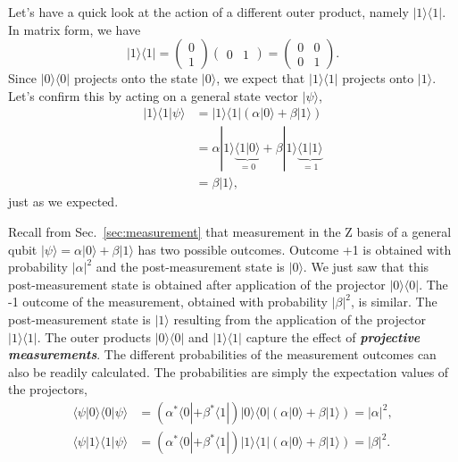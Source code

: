 Let's have a quick look at the action of a different outer product, namely $|1\rangle\langle1|$.
In matrix form, we have
\begin{equation}
    |1\rangle\langle1| = \begin{pmatrix} 0 \\ 1 \end{pmatrix} \begin{pmatrix} 0 & 1 \end{pmatrix} = \begin{pmatrix} 0 & 0  \\ 0 & 1 \end{pmatrix}.
\end{equation}
Since $|0\rangle\langle0|$ projects onto the state $|0\rangle$, we expect that $|1\rangle\langle1|$ projects onto $|1\rangle$.
Let's confirm this by acting on a general state vector $|\psi\rangle$,
\begin{align}
    |1\rangle\langle1|\psi\rangle & = |1\rangle\langle1| \left( \alpha|0\rangle + \beta|1\rangle \right) \label{eq:projector_11}\\
    & = \alpha |1\rangle\underbrace{\langle1|0\rangle}_{=0} + \beta |1\rangle\underbrace{\langle1|1\rangle}_{=1} \nonumber\\
    & = \beta|1\rangle, \nonumber
\end{align}
just as we expected.

Recall from Sec.~\ref{sec:measurement} that measurement in the Z basis of a general qubit $|\psi\rangle = \alpha |0\rangle + \beta |1\rangle$ has two possible outcomes.
Outcome +1 is obtained with probability $|\alpha|^2$ and the post-measurement state is $|0\rangle$.
We just saw that this post-measurement state is obtained after application of the projector $|0\rangle\langle0|$.
The -1 outcome of the measurement, obtained with probability $|\beta|^2$, is similar.
The post-measurement state is $|1\rangle$ resulting from the application of the projector $|1\rangle\langle1|$.
The outer products $|0\rangle\langle0|$ and $|1\rangle\langle1|$ capture the effect of \textit{\textbf{projective measurements}}.
The different probabilities of the measurement outcomes can also be readily calculated.
The probabilities are simply the expectation values of the projectors,
\begin{align}
    \langle \psi | 0 \rangle \langle 0 | \psi \rangle & = \left( \alpha^*\langle0| + \beta^*\langle1| \right) |0\rangle\langle0| \left( \alpha |0\rangle + \beta |1\rangle \right) = |\alpha|^2, \\
    \langle \psi | 1 \rangle \langle 1 | \psi \rangle & = \left( \alpha^*\langle0| + \beta^*\langle1| \right) |1\rangle\langle1| \left( \alpha |0\rangle + \beta |1\rangle \right) = |\beta|^2.
\end{align}

